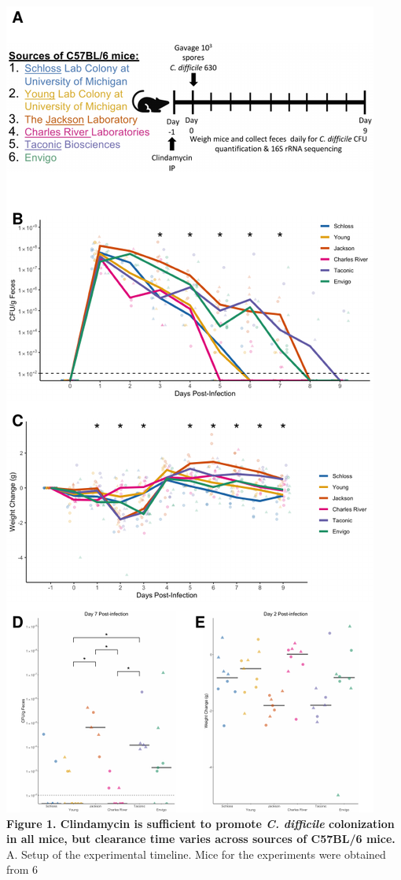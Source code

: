 \documentclass[11pt,]{article}
\begin{document}
\includegraphics{figure_1.pdf} \textbf{Figure 1. Clindamycin is
sufficient to promote \emph{C. difficile} colonization in all mice, but
clearance time varies across sources of C57BL/6 mice.} A. Setup of the
experimental timeline. Mice for the experiments were obtained from 6
\end{document}
